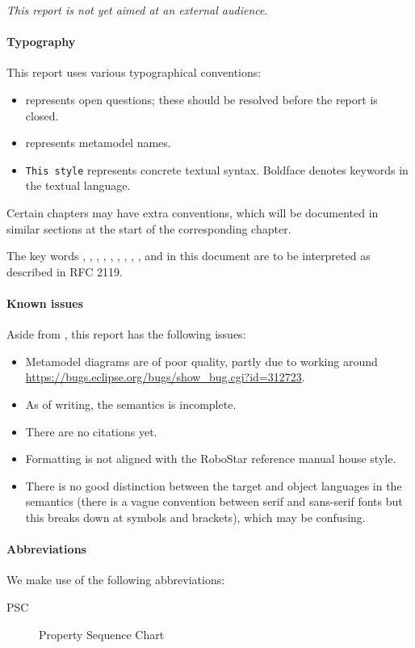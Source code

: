 
\emph{This report is not yet aimed at an external audience}.

\paragraph{Typography}
This report uses various typographical conventions:

\begin{itemize}
\item
	 represents open questions; these should be
	resolved before the report is closed.
\item
	 represents metamodel names.
\item
	\texttt{This style} represents concrete textual syntax.  Boldface
	denotes keywords in the textual language.
\end{itemize}

Certain chapters may have extra conventions, which will be documented in
similar sections at the start of the corresponding chapter.

The key words \rfcmust, \rfcmustnot, \rfcrequired, \rfcshall, \rfcshallnot,
\rfcshould, \rfcshouldnot, \rfcrecommended, \rfcmay, and \rfcoptional{} in this
document are to be interpreted as described in RFC 2119.

\paragraph{Known issues}
Aside from , this report has the following issues:

\begin{itemize}
\item
	Metamodel diagrams are of poor quality, partly due to working around
	\url{https://bugs.eclipse.org/bugs/show_bug.cgi?id=312723}.
\item
	As of writing, the semantics is incomplete.
\item
	There are no citations yet.	
\item
	Formatting is not aligned with the RoboStar reference manual house
	style.
\item
	There is no good distinction between the target and object languages
	in the semantics (there is a vague convention between serif and
	sans-serif fonts but this breaks down at symbols and brackets),
	which may be confusing.
\end{itemize}

\paragraph{Abbreviations} We make use of the following abbreviations:

\begin{description}
	\item[PSC] Property Sequence Chart~\cite{psc}
\end{description}
